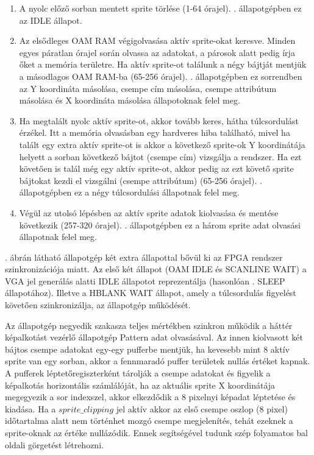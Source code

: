 	\begin{enumerate}
		\item A nyolc előző sorban mentett sprite törlése (1-64 órajel). . állapotgépben ez az IDLE állapot.
		\item Az elsődleges OAM RAM végigolvasása aktív sprite-okat keresve. Minden egyes páratlan órajel során olvassa az adatokat, a párosok alatt pedig írja őket a memória területre. Ha aktív sprite-ot találunk a négy bájtját mentjük a másodlagos OAM RAM-ba (65-256 órajel). . állapotgépben ez sorrendben az Y koordináta másolása, csempe cím másolása, csempe attribútum másolása és X koordináta másolása állapotoknak felel meg.
		\item Ha megtalált nyolc aktív sprite-ot, akkor tovább keres, hátha túlcsordulást érzékel. Itt a memória olvasásban egy hardveres hiba található, mivel ha talált egy extra aktív sprite-ot is akkor a következő sprite-ok Y koordinátája helyett a sorban következő bájtot (csempe cím) vizsgálja a rendszer. Ha ezt követően is talál még egy aktív sprite-ot, akkor pedig az ezt követő sprite bájtokat kezdi el vizsgálni (csempe attribútum) (65-256 órajel). . állapotgépben ez a négy túlcsordulási állapotnak felel meg.
		\item Végül az utolsó lépésben az aktív sprite adatok kiolvasása és mentése következik (257-320 órajel). . állapotgépben ez a három sprite adat olvasási állapotnak felel meg.
	\end{enumerate}

	. ábrán látható állapotgép két extra állapottal bővül ki az FPGA rendszer szinkronizációja miatt. Az első két állapot (OAM IDLE és SCANLINE WAIT) a VGA jel generálás alatti IDLE állapotot reprezentálja (hasonlóan . SLEEP állapotához). Illetve a HBLANK WAIT állapot, amely a túlcsordulás figyelést követően szinkronizálja, az állapotgép működését.

	Az állapotgép negyedik szakasza teljes mértékben szinkron működik a háttér képalkotást vezérlő állapotgép Pattern adat olvasásával. Az innen kiolvasott két bájtos csempe adatokat egy-egy pufferbe mentjük, ha kevesebb mint 8 aktív sprite van egy sorban, akkor a fennmaradó puffer területek nullás értéket kapnak. A pufferek léptetőregiszterként tárolják a csempe adatokat és figyelik a képalkotás horizontális számlálóját, ha az aktuális sprite X koordinátája megegyezik a sor indexszel, akkor elkezdődik a 8 pixelnyi képadat léptetése és kiadása. Ha a $sprite\_clipping$ jel aktív akkor az első csempe oszlop (8 pixel) időtartalma alatt nem történhet mozgó csempe megjelenítés, tehát ezeknek a sprite-oknak az értéke nullázódik. %
	Ennek segítségével tudunk szép folyamatos bal oldali görgetést létrehozni.
	
